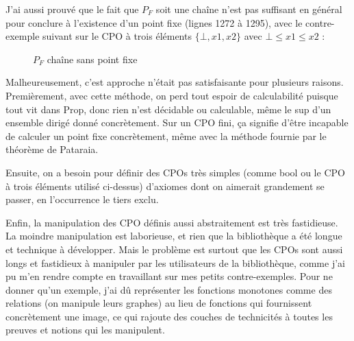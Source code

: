 \documentclass{article}
\newcommand\code[1]{{\fontfamily{lmtt}\selectfont #1}}
\theoremstyle{definition}
\begin{document}
J'ai aussi prouvé que le fait que $P_F$ soit une chaîne n'est pas suffisant en général pour conclure à l'existence d'un point fixe (lignes 1272 à 1295), avec le contre-exemple suivant sur le CPO à trois éléments $\{\bot, x1, x2 \}$ avec $\bot \leq x1 \leq x2$ :

\begin{figure}[ht]
\centering
\resizebox{0.09\linewidth}{!}
	{
	}
\caption{$P_F$ chaîne sans point fixe}
\end{figure}

\bigskip

Malheureusement, c'est approche n'était pas satisfaisante pour plusieurs raisons. Premièrement, avec cette méthode, on perd tout espoir de calculabilité puisque tout vit dans \code{Prop}, donc rien n'est décidable ou calculable, même le sup d'un ensemble dirigé donné concrètement. Sur un CPO fini, ça signifie d'être incapable de calculer un point fixe concrètement, même avec la méthode fournie par le théorème de Pataraia.

Ensuite, on a besoin pour définir des CPOs très simples (comme \code{bool} ou le CPO à trois éléments utilisé ci-dessus) d'axiomes dont on aimerait grandement se passer, en l'occurrence le tiers exclu.

Enfin, la manipulation des CPO définis aussi abstraitement est très fastidieuse. La moindre manipulation est laborieuse, et rien que la bibliothèque a été longue et technique à développer. Mais le problème est surtout que les CPOs sont aussi longs et fastidieux à manipuler par les utilisateurs de la bibliothèque, comme j'ai pu m'en rendre compte en travaillant sur mes petits contre-exemples. Pour ne donner qu'un exemple, j'ai dû représenter les fonctions monotones comme des relations (on manipule leurs graphes) au lieu de fonctions qui fournissent concrètement une image, ce qui rajoute des couches de technicités à toutes les preuves et notions qui les manipulent.
\end{document}
